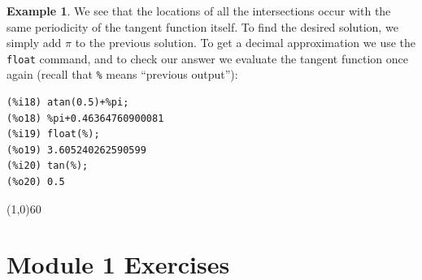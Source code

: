 \documentclass[10.5pt,twoside]{report}
\theoremstyle{definition}
\newtheorem{exmp}{Example}[section]
\begin{document}
\begin{exmp}
We see that the locations of all the intersections occur with the same periodicity of the tangent function itself.  To find the desired solution, we simply add $\pi$ to the previous solution.  To get a decimal approximation we use the \verb|float| command, and to check our answer we evaluate the tangent function once again (recall that \verb|%| means ``previous output''):

\begin{verbatim}
(%i18) atan(0.5)+%pi;
(%o18) %pi+0.46364760900081
(%i19) float(%);
(%o19) 3.605240262590599
(%i20) tan(%);
(%o20) 0.5
\end{verbatim}




\end{exmp}

\line(1,0){60}
\linethickness{0.5mm}

\pagebreak

\section{Module 1 Exercises}\label{Exercises}
\end{document}
